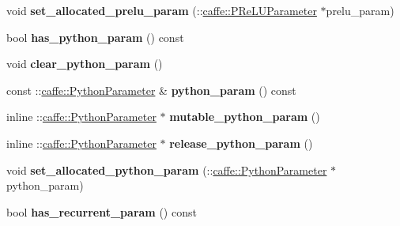 \begin{DoxyCompactItemize}
\mbox{\label{classcaffe_1_1_layer_parameter_aeb4be95f66c78a3245abd23ab583f7b8}} 
void {\bfseries set\+\_\+allocated\+\_\+prelu\+\_\+param} (\+::\mbox{\hyperlink{classcaffe_1_1_p_re_l_u_parameter}{caffe\+::\+P\+Re\+L\+U\+Parameter}} $\ast$prelu\+\_\+param)
\item 
\mbox{\label{classcaffe_1_1_layer_parameter_a002650bcb2ff05646e11c39e365ec846}} 
bool {\bfseries has\+\_\+python\+\_\+param} () const
\item 
\mbox{\label{classcaffe_1_1_layer_parameter_afed332cb15911c727a8ba14f1890112e}} 
void {\bfseries clear\+\_\+python\+\_\+param} ()
\item 
\mbox{\label{classcaffe_1_1_layer_parameter_a34082fd9e7471f640d318655949771e5}} 
const \+::\mbox{\hyperlink{classcaffe_1_1_python_parameter}{caffe\+::\+Python\+Parameter}} \& {\bfseries python\+\_\+param} () const
\item 
\mbox{\label{classcaffe_1_1_layer_parameter_ae91625b19593499bfba34f485767660e}} 
inline \+::\mbox{\hyperlink{classcaffe_1_1_python_parameter}{caffe\+::\+Python\+Parameter}} $\ast$ {\bfseries mutable\+\_\+python\+\_\+param} ()
\item 
\mbox{\label{classcaffe_1_1_layer_parameter_a7d888d892c886a073be54ee684258fe5}} 
inline \+::\mbox{\hyperlink{classcaffe_1_1_python_parameter}{caffe\+::\+Python\+Parameter}} $\ast$ {\bfseries release\+\_\+python\+\_\+param} ()
\item 
\mbox{\label{classcaffe_1_1_layer_parameter_acacf6d53847d0291fbe97f2a3c883aa0}} 
void {\bfseries set\+\_\+allocated\+\_\+python\+\_\+param} (\+::\mbox{\hyperlink{classcaffe_1_1_python_parameter}{caffe\+::\+Python\+Parameter}} $\ast$python\+\_\+param)
\item 
\mbox{\label{classcaffe_1_1_layer_parameter_a9ef337a844db8e5970fe4fc3929318ba}} 
bool {\bfseries has\+\_\+recurrent\+\_\+param} () const
\item 
\mbox{\label{classcaffe_1_1_layer_parameter_a0b77d9e4d95c47d3799dc81ba3f44c61}} 

\end{DoxyCompactItemize}
